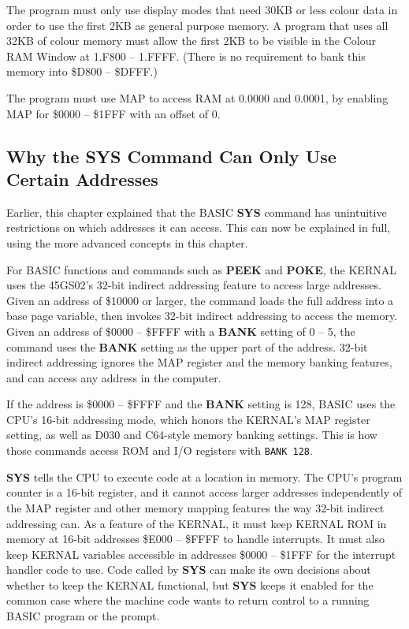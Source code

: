 The program must only use display modes that need 30KB or less colour data in order to use the first 2KB as general purpose memory. A program that uses all 32KB of colour memory must allow the first 2KB to be visible in the Colour RAM Window at 1.F800 -- 1.FFFF. (There is no requirement to bank this memory into \$D800 -- \$DFFF.)

The program must use MAP to access RAM at 0.0000 and 0.0001, by enabling MAP for \$0000 -- \$1FFF with an offset of 0.

\subsection{Why the SYS Command Can Only Use Certain Addresses}

Earlier, this chapter explained that the BASIC {\bf SYS} command has unintuitive restrictions on which addresses it can access. This can now be explained in full, using the more advanced concepts in this chapter.

For BASIC functions and commands such as {\bf PEEK} and {\bf POKE}, the KERNAL uses the 45GS02's 32-bit indirect addressing feature to access large addresses. Given an address of \$10000 or larger, the command loads the full address into a base page variable, then invokes 32-bit indirect addressing to access the memory. Given an address of \$0000 -- \$FFFF with a {\bf BANK} setting of 0 -- 5, the command uses the {\bf BANK} setting as the upper part of the address. 32-bit indirect addressing ignores the MAP register and the memory banking features, and can access any address in the computer.

If the address is \$0000 -- \$FFFF and the {\bf BANK} setting is 128, BASIC uses the CPU's 16-bit addressing mode, which honors the KERNAL's MAP register setting, as well as D030 and C64-style memory banking settings. This is how those commands access ROM and I/O registers with \texttt{BANK 128}.

{\bf SYS} tells the CPU to execute code at a location in memory. The CPU's program counter is a 16-bit register, and it cannot access larger addresses independently of the MAP register and other memory mapping features the way 32-bit indirect addressing can. As a feature of the KERNAL, it must keep KERNAL ROM in memory at 16-bit addresses \$E000 -- \$FFFF to handle interrupts. It must also keep KERNAL variables accessible in addresses \$0000 -- \$1FFF for the interrupt handler code to use. Code called by {\bf SYS} can make its own decisions about whether to keep the KERNAL functional, but {\bf SYS} keeps it enabled for the common case where the machine code wants to return control to a running BASIC program or the  prompt.

